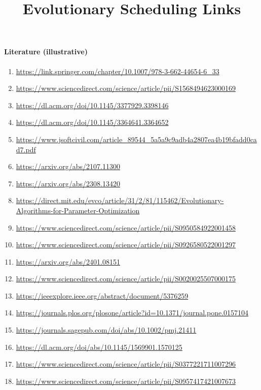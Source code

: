 \documentclass[a4paper,12pt]{article}
\title{\vspace{-2em}\bfseries Evolutionary Scheduling Links}
\author{}
\date{}
\begin{document}
\maketitle
\vspace{-1em}


\paragraph{Literature (illustrative)}
\begin{enumerate}
  \item \url{https://link.springer.com/chapter/10.1007/978-3-662-44654-6_33}
  \item \url{https://www.sciencedirect.com/science/article/pii/S1568494623000169}
  \item \url{https://dl.acm.org/doi/10.1145/3377929.3398146}
  \item \url{https://dl.acm.org/doi/10.1145/3364641.3364652}
  \item \url{https://www.jsoftcivil.com/article_89544_5a5a9c9adb4a2807ea4b19bfadd0cad7.pdf}
  \item \url{https://arxiv.org/abs/2107.11300}
  \item \url{https://arxiv.org/abs/2308.13420}
  \item \url{https://direct.mit.edu/evco/article/31/2/81/115462/Evolutionary-Algorithms-for-Parameter-Optimization}
  \item \url{https://www.sciencedirect.com/science/article/pii/S0950584922001458}
  \item \url{https://www.sciencedirect.com/science/article/pii/S0926580522001297}
  \item \url{https://arxiv.org/abs/2401.08151}
    \item \url{https://www.sciencedirect.com/science/article/pii/S0020025507000175}
    \item \url{https://ieeexplore.ieee.org/abstract/document/5376259}
    \item \url{https://journals.plos.org/plosone/article?id=10.1371/journal.pone.0157104}
    \item \url{https://journals.sagepub.com/doi/abs/10.1002/pmj.21411}
    \item \url{https://dl.acm.org/doi/abs/10.1145/1569901.1570125}
  \item \url{https://www.sciencedirect.com/science/article/pii/S0377221711007296}
  \item \url{https://www.sciencedirect.com/science/article/pii/S0957417421007673}

\end{enumerate}
\end{document}
